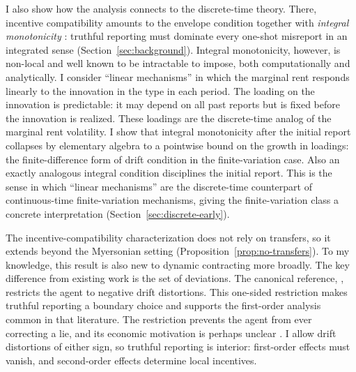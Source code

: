 \documentclass[12pt]{article}
\begin{document}
I also show how the analysis connects to the discrete-time theory. There,
incentive compatibility amounts to the envelope condition together with
\emph{integral monotonicity} \citep{pavan2014dynamic}: truthful reporting must
dominate every one-shot misreport in an integrated sense
(Section~\ref{sec:background}). Integral monotonicity, however, is
non-local and well known to be intractable to impose, both computationally and
analytically. I consider ``linear mechanisms'' in which the marginal rent responds linearly to the innovation in the type in each period. The loading on the innovation is predictable: it may depend on all past reports but
is fixed before the innovation is realized. These loadings are the
discrete-time analog of the marginal rent volatility. I show that integral monotonicity after the initial report collapses by elementary algebra to a
pointwise bound on the growth in loadings: the finite-difference form of drift condition in the finite-variation case. Also an exactly analogous integral condition disciplines the initial report. This is the sense in which ``linear mechanisms'' are the discrete-time counterpart of continuous-time finite-variation mechanisms, giving the finite-variation class a concrete interpretation 
(Section~\ref{sec:discrete-early}).



The incentive-compatibility characterization does not rely on transfers,
so it extends beyond the Myersonian setting
(Proposition~\ref{prop:no-transfers}). To my knowledge, this result is
also new to dynamic contracting more broadly. The key difference from
existing work is the set of deviations. The canonical reference,
\citet{williams2011persistent}, restricts the agent to negative drift
distortions. This one-sided restriction makes truthful reporting a
boundary choice and supports the first-order analysis common in that
literature. The
restriction prevents the agent from ever correcting a lie, and its economic
motivation is perhaps unclear \citep{bloedel2023persistent}. I allow drift distortions of either sign, so truthful
reporting is interior: first-order effects must vanish, and second-order
effects determine local incentives.
\end{document}
